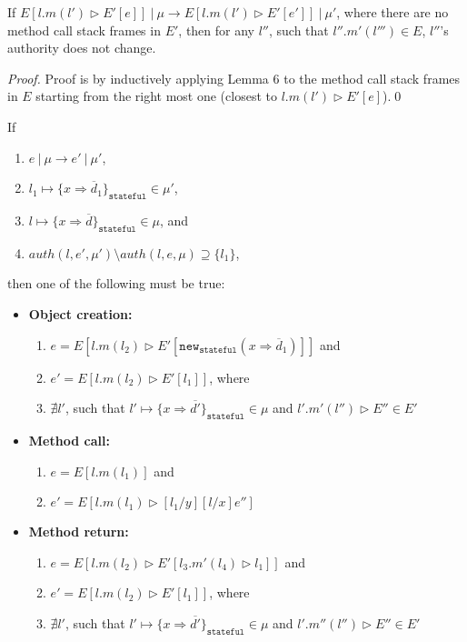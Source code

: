 \documentclass{llncs}
\newcommand{\keywadj}[1]{\mathtt{#1}}
\begin{document}
\begin{lemma} If 
\mbox{$E[l.m(l') \rhd E'[e]]~|~\mu \longrightarrow E[l.m(l') \rhd E'[e']]~|~\mu'$}, where there are no method call stack frames in $E'$, then for any $l''$, such that $l''.m'(l''') \in E$, $l''$'s authority does not change.
\end{lemma}

\begin{proof}
Proof is by inductively applying Lemma 6 to the method call stack frames in $E$ starting from the right most one (closest to $l.m(l') \rhd E'[e]$).\qed
\end{proof}

\newpage

\begin{theorem} If
\begin{enumerate}
\item $e~|~\mu \longrightarrow e'~|~\mu'$,
\item $l_1 \mapsto \{ x \Rightarrow \overline{d}_1 \}_{\keywadj{stateful}} \in \mu'$,
\item $l \mapsto \{ x \Rightarrow \overline{d} \}_{\keywadj{stateful}} \in \mu$, and
\item $auth(l, e', \mu') \setminus auth(l, e, \mu) \supseteq \{ l_1 \}$,
\end{enumerate}
then one of the following must be true:
\begin{itemize}
\item \textbf{Object creation:}
\begin{enumerate}
\item $e = E[l.m(l_2) \rhd E'[\keywadj{new}_{\keywadj{stateful}}(x \Rightarrow \overline{d}_1)]]$ and
\item $e' = E[l.m(l_2) \rhd E'[l_1]]$, where
\item $\nexists l'$, such that $l' \mapsto \{ x \Rightarrow \overline{d'}\}_{\keywadj{stateful}} \in \mu$ and $l'.m'(l'') \rhd E'' \in E'$
\end{enumerate}

\item \textbf{Method call:}
\begin{enumerate}
\item $e = E[l.m(l_1)]$ and
\item $e' = E[l.m(l_1) \rhd [l_1/y][l/x]e'']$
\end{enumerate}

\item \textbf{Method return:}
\begin{enumerate}
\item $e = E[l.m(l_2) \rhd E'[l_3.m'(l_4) \rhd l_1]]$ and
\item $e' = E[l.m(l_2) \rhd E'[l_1]]$, where
\item $\nexists l'$, such that $l' \mapsto \{ x \Rightarrow \overline{d'}\}_{\keywadj{stateful}} \in \mu$ and $l'.m''(l'') \rhd E'' \in E'$
\end{enumerate}
\end{itemize}

\end{theorem}
\end{document}
